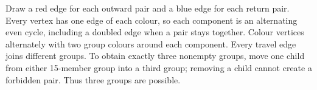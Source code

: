 Draw a red edge for each outward pair and a blue edge for each return pair. Every vertex has one edge of each colour, so each component is an alternating even cycle, including a doubled edge when a pair stays together. Colour vertices alternately with two group colours around each component. Every travel edge joins different groups. To obtain exactly three nonempty groups, move one child from either 15-member group into a third group; removing a child cannot create a forbidden pair. Thus three groups are possible.
